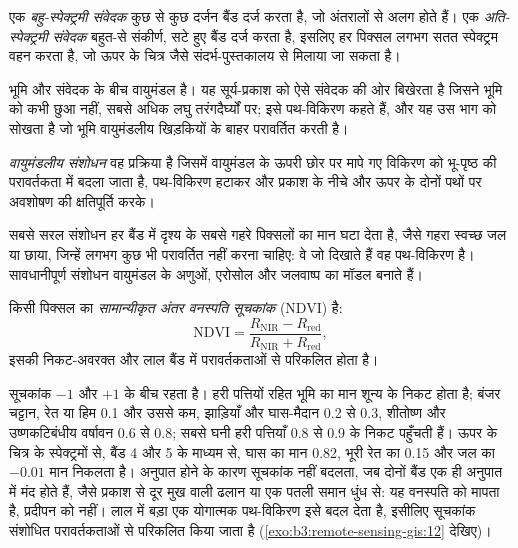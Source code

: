 \begin{definition}[बहु-स्पेक्ट्रमी और अति-स्पेक्ट्रमी संवेदक]\label{def:b3:remote-sensing-gis:sensors}
एक \emph{बहु-स्पेक्ट्रमी संवेदक} कुछ
से कुछ दर्जन बैंड दर्ज करता है, जो अंतरालों से अलग होते हैं। एक \emph{अति-स्पेक्ट्रमी
संवेदक} बहुत-से संकीर्ण, सटे हुए बैंड दर्ज करता है,
इसलिए हर पिक्सल लगभग सतत स्पेक्ट्रम वहन करता है, जो
ऊपर के चित्र जैसे संदर्भ-पुस्तकालय से मिलाया जा सकता है।
\end{definition}

भूमि और संवेदक के बीच वायुमंडल है। यह
सूर्य-प्रकाश को ऐसे संवेदक की ओर बिखेरता है जिसने भूमि को कभी छुआ नहीं, सबसे अधिक
लघु तरंगदैर्घ्यों पर; इसे पथ-विकिरण कहते हैं, और यह उस भाग को सोखता है जो
भूमि वायुमंडलीय खिड़कियों के बाहर परावर्तित करती है।

\begin{definition}[वायुमंडलीय संशोधन]\label{def:b3:remote-sensing-gis:atm-correction}
\emph{वायुमंडलीय संशोधन} वह प्रक्रिया है जिसमें
वायुमंडल के ऊपरी छोर पर मापे गए विकिरण को भू-पृष्ठ की परावर्तकता में बदला जाता है,
पथ-विकिरण हटाकर और प्रकाश के नीचे और ऊपर के दोनों पथों पर
अवशोषण की क्षतिपूर्ति करके।
\end{definition}

सबसे सरल संशोधन हर बैंड में दृश्य के सबसे गहरे
पिक्सलों का मान घटा देता है, जैसे गहरा स्वच्छ जल या छाया, जिन्हें लगभग कुछ भी
परावर्तित नहीं करना चाहिए: वे जो दिखाते हैं वह पथ-विकिरण है। सावधानीपूर्ण संशोधन
वायुमंडल के अणुओं, एरोसोल और जलवाष्प का मॉडल बनाते हैं।

\begin{definition}[सामान्यीकृत अंतर वनस्पति सूचकांक]\label{def:b3:remote-sensing-gis:ndvi}
किसी पिक्सल का \emph{सामान्यीकृत अंतर वनस्पति
सूचकांक} (NDVI) है:
\[
\mathrm{NDVI} = \frac{R_\mathrm{NIR} - R_\mathrm{red}}{R_\mathrm{NIR} + R_\mathrm{red}} ,
\]
इसकी निकट-अवरक्त और लाल बैंड में परावर्तकताओं से परिकलित होता है।
\end{definition}

सूचकांक $-1$ और $+1$ के बीच रहता है। हरी पत्तियों रहित भूमि का मान
शून्य के निकट होता है; बंजर चट्टान, रेत या हिम \num{0.1} और उससे कम,
झाड़ियाँ और घास-मैदान 0.2 से 0.3, शीतोष्ण और उष्णकटिबंधीय वर्षावन 0.6 से
0.8; सबसे घनी हरी पत्तियाँ 0.8 से 0.9 के निकट पहुँचती हैं। ऊपर के चित्र के स्पेक्ट्रमों से,
बैंड 4 और 5 के माध्यम से, घास का मान 0.82, भूरी रेत का
0.15 और जल का $-0.01$ मान निकलता है। अनुपात होने के कारण सूचकांक नहीं बदलता, जब
दोनों बैंड एक ही अनुपात में मंद होते हैं, जैसे प्रकाश से दूर मुख वाली ढलान
या एक पतली समान धुंध से: यह वनस्पति को मापता है, प्रदीपन को नहीं।
लाल में बड़ा एक योगात्मक पथ-विकिरण इसे बदल देता है,
इसीलिए सूचकांक संशोधित परावर्तकताओं से परिकलित किया जाता है
(\cref{exo:b3:remote-sensing-gis:12} देखिए)।

